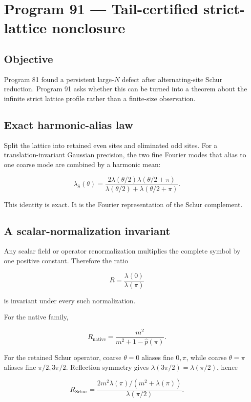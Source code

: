 \documentclass[11pt,a4paper,openany]{report}
\begin{document}
\chapter{Program 91 --- Tail-certified strict-lattice nonclosure}

\section{Objective}

Program 81 found a persistent large-\(N\) defect after alternating-site Schur reduction. Program 91 asks whether this can be turned into a theorem about the infinite strict lattice profile rather than a finite-size observation.

\section{Exact harmonic-alias law}

Split the lattice into retained even sites and eliminated odd sites. For a translation-invariant Gaussian precision, the two fine Fourier modes that alias to one coarse mode are combined by a harmonic mean:

\[
\lambda_{\mathrm{S}}(\theta)
=
\frac{
2\lambda(\theta/2)\lambda(\theta/2+\pi)
}{
\lambda(\theta/2)+\lambda(\theta/2+\pi)
}.
\]

This identity is exact. It is the Fourier representation of the Schur complement.

\section{A scalar-normalization invariant}

Any scalar field or operator renormalization multiplies the complete symbol by one positive constant. Therefore the ratio

\[
R=\frac{\lambda(0)}{\lambda(\pi)}
\]

is invariant under every such normalization.

For the native family,

\[
R_{\mathrm{native}}
=
\frac{m^2}{m^2+1-\widehat p(\pi)}.
\]

For the retained Schur operator, coarse \(\theta=0\) aliases fine \(0,\pi\), while coarse \(\theta=\pi\) aliases fine \(\pi/2,3\pi/2\). Reflection symmetry gives \(\lambda(3\pi/2)=\lambda(\pi/2)\), hence

\[
R_{\mathrm{Schur}}
=
\frac{
2m^2\lambda(\pi)/(m^2+\lambda(\pi))
}{
\lambda(\pi/2)
}.
\]
\end{document}
